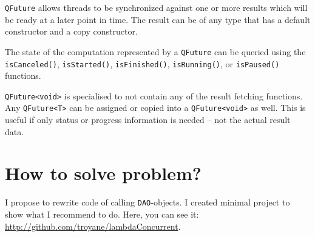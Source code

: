 \documentclass[a4paper,12pt]{scrartcl}
\begin{document}
\texttt{QFuture} allows threads to be synchronized against one or more results which will be ready at a later point 
in time. The result can be of any type that has a default constructor and a copy constructor. 

The state of the computation represented by a \texttt{QFuture} can be queried using the \texttt{isCanceled()}, 
\texttt{isStarted()}, \texttt{isFinished()}, \texttt{isRunning()}, or \texttt{isPaused()} functions.

\texttt{QFuture<void>} is specialised to not contain any of the result fetching functions. Any \texttt{QFuture<T>} 
can be assigned or copied into a \texttt{QFuture<void>} as well. This is useful if only status or progress information 
is needed -- not the actual result data.

\section{How to solve problem?}
I propose to rewrite code of calling \texttt{DAO}-objects. I created minimal project to show what I recommend to do. 
Here, you can see it: \url{http://github.com/troyane/lambdaConcurrent}.
\end{document}
